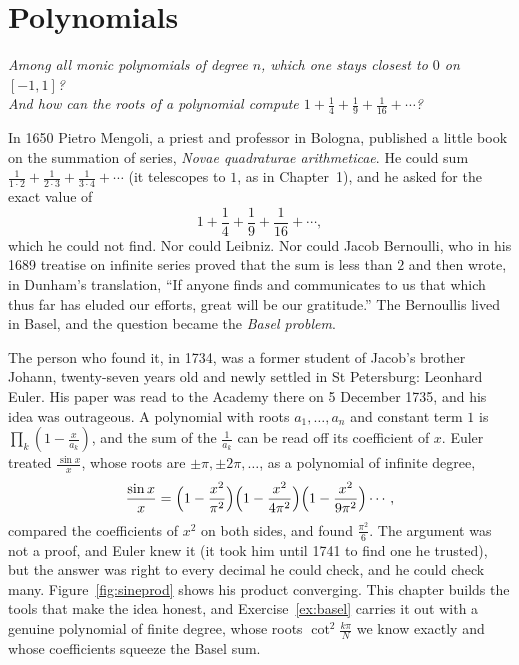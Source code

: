 \chapter{Polynomials}

\begin{center}\itshape
Among all monic polynomials of degree $n$, which one stays closest to $0$ on $[-1,1]$?\\
And how can the roots of a polynomial compute $1+\frac14+\frac19+\frac1{16}+\cdots$?
\end{center}

In 1650 Pietro Mengoli, a priest and professor in Bologna, published a little book on the summation of series, \emph{Novae quadraturae
arithmeticae}. He could sum $\frac1{1\cdot2}+\frac1{2\cdot3}+\frac1{3\cdot4}+\cdots$ (it telescopes to $1$, as in Chapter~1), and he asked for the
exact value of
\[
1+\frac14+\frac19+\frac1{16}+\cdots,
\]
which he could not find. Nor could Leibniz. Nor could Jacob Bernoulli, who in his 1689 treatise on infinite series proved that the sum is less than
$2$ and then wrote, in Dunham's translation, ``If anyone finds and communicates to us that which thus far has eluded our efforts, great will be our
gratitude.'' The Bernoullis lived in Basel, and the question became the \emph{Basel problem}.

The person who found it, in 1734, was a former student of Jacob's brother Johann, twenty-seven years old and newly settled in St Petersburg:
Leonhard Euler. His paper was read to the Academy there on 5 December 1735, and his idea was outrageous. A polynomial with roots $a_1,\dots,a_n$
and constant term $1$ is $\prod_k(1-\frac x{a_k})$, and the sum of the $\frac1{a_k}$ can be read off its coefficient of $x$. Euler treated
$\frac{\sin x}x$, whose roots are $\pm\pi,\pm2\pi,\dots$, as a polynomial of infinite degree,
\[
\frac{\sin x}x=\Bigl(1-\frac{x^2}{\pi^2}\Bigr)\Bigl(1-\frac{x^2}{4\pi^2}\Bigr)\Bigl(1-\frac{x^2}{9\pi^2}\Bigr)\cdots,
\]
compared the coefficients of $x^2$ on both sides, and found $\frac{\pi^2}6$. The argument was not a proof, and Euler knew it (it took him until
1741 to find one he trusted), but the answer was right to every decimal he could check, and he could check many. Figure~\ref{fig:sineprod} shows
his product converging. This chapter builds the tools that make the idea honest, and Exercise~\ref{ex:basel} carries it out with a genuine
polynomial of finite degree, whose roots $\cot^2\frac{k\pi}N$ we know exactly and whose coefficients squeeze the Basel sum.

